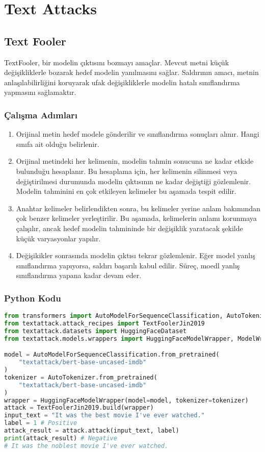\section{Text Attacks}

\subsection{Text Fooler}

TextFooler, bir modelin çıktısını bozmayı amaçlar. Mevcut metni küçük değişikliklerle bozarak hedef modelin yanılmasını sağlar. Saldırının amacı, metnin anlaşılabilirliğini koruyarak ufak değişikliklerle modelin hatalı sınıflandırma yapmasını sağlamaktır.

\subsubsection{Çalışma Adımları}

\begin{enumerate}
    \item Orijinal metin hedef modele gönderilir ve sınıflandırma sonuçları alınır. Hangi sınıfa ait olduğu belirlenir.
    \item Orijinal metindeki her kelimenin, modelin tahmin sonucuna ne kadar etkide bulunduğu hesaplanır. Bu hesaplama için, her kelimenin silinmesi veya değiştirilmesi durumunda modelin çıktısının ne kadar değiştiği gözlemlenir. Modelin tahminini en çok etkileyen kelimeler bu aşamada tespit edilir.
    \item Anahtar kelimeler belirlendikten sonra, bu kelimeler yerine anlam bakımından çok benzer kelimeler yerleştirilir. Bu aşamada, kelimelerin anlamı korunmaya çalışılır, ancak hedef modelin tahmininde bir değişiklik yaratacak şekilde küçük varyasyonlar yapılır. 
    \item Değişikikler sonrasında modelin çıktısı tekrar gözlemlenir. Eğer model yanlış sınıflandırma yapıyorsa, saldırı başarılı kabul edilir. Süreç, moedl yanlış sınıflandırma yapana kadar devam eder.
\end{enumerate}

\subsubsection{Python Kodu}

\begin{lstlisting}[language=Python]
from transformers import AutoModelForSequenceClassification, AutoTokenizer
from textattack.attack_recipes import TextFoolerJin2019
from textattack.datasets import HuggingFaceDataset
from textattack.models.wrappers import HuggingFaceModelWrapper, ModelWrapper

model = AutoModelForSequenceClassification.from_pretrained(
    "textattack/bert-base-uncased-imdb"
)
tokenizer = AutoTokenizer.from_pretrained(
    "textattack/bert-base-uncased-imdb"
)
wrapper = HuggingFaceModelWrapper(model=model, tokenizer=tokenizer)
attack = TextFoolerJin2019.build(wrapper)
input_text = "It was the best movie I've ever watched."
label = 1 # Positive
attack_result = attack.attack(input_text, label)
print(attack_result) # Negative
# It was the noblest movie I've ever watched.
\end{lstlisting}

